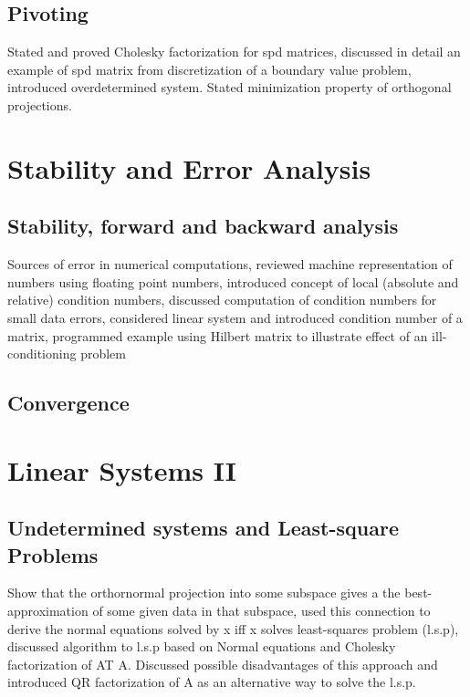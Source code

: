 \documentclass{article}
\theoremstyle{remark}
\begin{document}
\subsection{Pivoting}%
\label{sub:pivoting}
\begin{tcolorbox}
  Stated and proved Cholesky factorization for spd matrices, discussed in detail an example of spd matrix from discretization of a boundary value problem, introduced overdetermined system. Stated minimization property of orthogonal projections.
\end{tcolorbox}

\newpage
\section{Stability and Error Analysis}%
\label{sec:stability_and_error_analysis}


\subsection{Stability, forward and backward analysis}%
\label{sub:stability_forward_and_backward_analysis}

\begin{tcolorbox}
  Sources of error in numerical computations, reviewed machine representation of numbers using floating point numbers, introduced concept of local (absolute and relative) condition numbers, discussed computation of condition numbers for small data errors, considered linear system and introduced condition number of a matrix, programmed example using Hilbert matrix to illustrate effect of an ill-conditioning problem	
\end{tcolorbox}
\subsection{Convergence}%
\label{sub:convergence}

\newpage
\section{Linear Systems II}%
\label{sec:linear_systems_ii}

\subsection{Undetermined systems and Least-square Problems}%
\label{sub:undetermined_systems_and_least_square_problems}
\begin{tcolorbox}
  Show that the orthornormal projection into some subspace gives a the best-approximation of some given data in that subspace, used this connection to derive the normal equations solved by x iff x solves least-squares problem (l.s.p), discussed algorithm to l.s.p based on Normal equations and Cholesky factorization of AT A. Discussed possible disadvantages of this approach and introduced QR factorization of A as an alternative way to solve the l.s.p.	
\end{tcolorbox}
\end{document}
